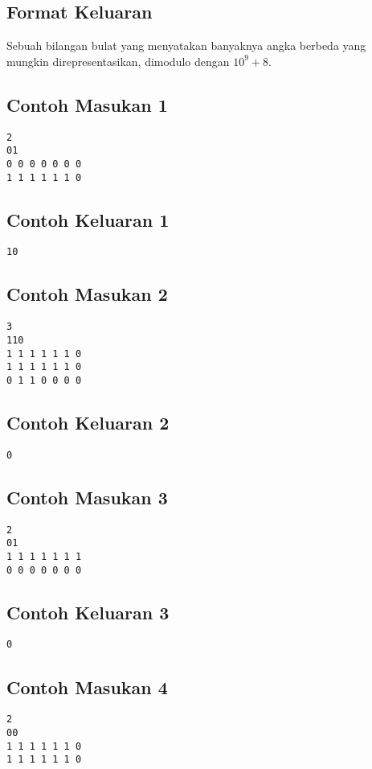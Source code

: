 \documentclass{article}
\begin{document}
\subsection*{Format Keluaran}

\par\noindent Sebuah bilangan bulat yang menyatakan banyaknya angka berbeda yang mungkin direpresentasikan, dimodulo dengan $10^9 + 8$.

\subsection*{Contoh Masukan 1}
\begin{lstlisting}
2
01
0 0 0 0 0 0 0
1 1 1 1 1 1 0
\end{lstlisting}
\subsection*{Contoh Keluaran 1}
\begin{lstlisting}
10
\end{lstlisting}


\subsection*{Contoh Masukan 2}
\begin{lstlisting}
3
110
1 1 1 1 1 1 0
1 1 1 1 1 1 0
0 1 1 0 0 0 0
\end{lstlisting}
\subsection*{Contoh Keluaran 2}
\begin{lstlisting}
0
\end{lstlisting}

\subsection*{Contoh Masukan 3}
\begin{lstlisting}
2
01
1 1 1 1 1 1 1
0 0 0 0 0 0 0
\end{lstlisting}
\subsection*{Contoh Keluaran 3}
\begin{lstlisting}
0
\end{lstlisting}

\subsection*{Contoh Masukan 4}
\begin{lstlisting}
2
00
1 1 1 1 1 1 0
1 1 1 1 1 1 0
\end{lstlisting}
\end{document}
